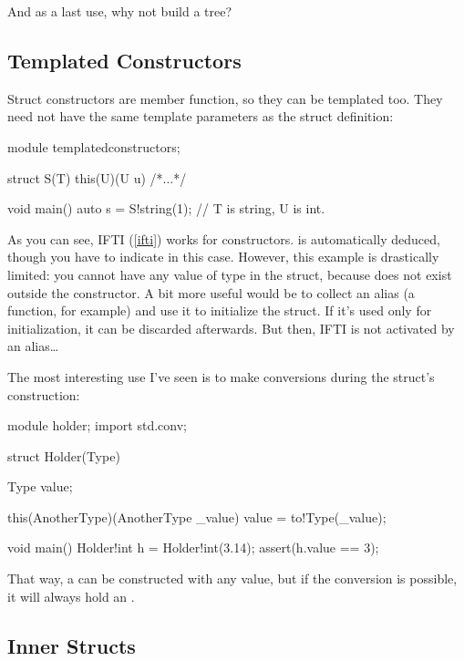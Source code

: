 And as a last use, why not build a tree? 


\subsection{Templated Constructors}\label{constructortemplates}

Struct constructors are member function, so they can be templated too. They need not have the same template parameters as the struct definition:

\begin{dcode}
module templatedconstructors;

struct S(T)
{
    this(U)(U u) { /*...*/ }
}

void main()
{
    auto s = S!string(1); // T is string, U is int.
}
\end{dcode}

As you can see, IFTI (\ref{ifti}) works for constructors.  is automatically deduced, though you have to indicate  in this case. However, this example is drastically limited: you cannot have any value of type  in the struct, because  does not exist outside the constructor. A bit more useful would be to collect an alias (a function, for example) and use it to initialize the struct. If it's used only for initialization, it can be discarded afterwards. But then, IFTI is not activated by an alias\ldots

The most interesting use I've seen is to make conversions during the struct's construction:

\begin{dcode}
module holder;
import std.conv;

struct Holder(Type)
{
    Type value;

    this(AnotherType)(AnotherType _value)
    {
        value = to!Type(_value);
    }
}

void main()
{
    Holder!int h = Holder!int(3.14);
    assert(h.value == 3);
}
\end{dcode}

That way, a  can be constructed with any value, but if the conversion is possible, it will always hold an .

\subsection{Inner Structs}\label{innerstructs}

